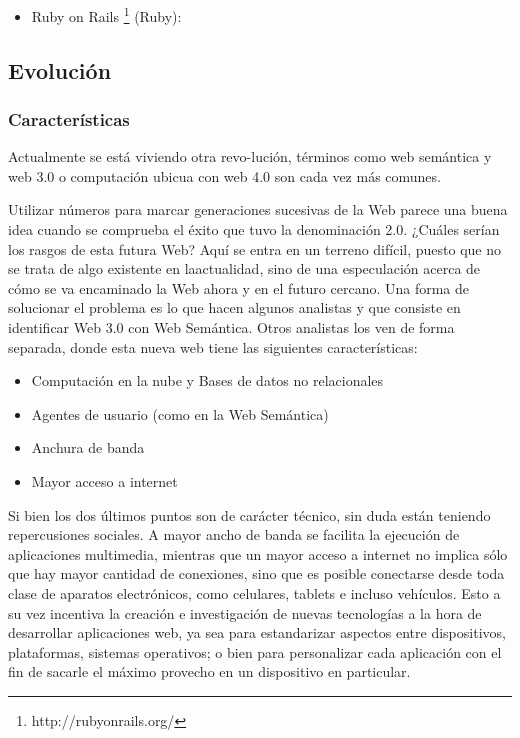 \begin{itemize}
 \item Ruby on Rails \footnote{http://rubyonrails.org/} (Ruby): 
\end{itemize}

 
\subsection{Evolución}

\subsubsection{Características}
Actualmente se está viviendo otra revo-lución, términos como web semántica y web 3.0 o computación 
ubicua con web 4.0 son cada vez más comunes.

Utilizar números para marcar generaciones sucesivas de la Web parece una buena idea cuando se 
comprueba el éxito que tuvo la denominación 2.0. ¿Cuáles serían los rasgos de esta futura Web? Aquí 
se entra en un terreno difícil, puesto que no se trata de algo existente en laactualidad, sino de una 
especulación acerca de cómo se va encaminado la Web ahora y en el futuro cercano. Una forma de solucionar el 
problema es lo que hacen algunos analistas y que consiste en identificar Web 3.0 con Web Semántica. Otros 
analistas los ven de forma separada, donde esta nueva web tiene las siguientes características:

\begin{itemize}
 \item Computación en la nube y Bases de datos no relacionales
 \item Agentes de usuario (como en la Web Semántica)
 \item Anchura de banda
 \item Mayor acceso a internet
\end{itemize}

Si bien los dos últimos puntos son de carácter técnico, sin duda están teniendo repercusiones sociales. 
A mayor ancho de banda se facilita la ejecución de aplicaciones multimedia, mientras que un mayor acceso 
a internet no implica sólo que hay mayor cantidad de conexiones, sino que es posible conectarse desde toda 
clase de aparatos electrónicos, como celulares, tablets e incluso vehículos. Esto a su vez incentiva la 
creación e investigación de nuevas tecnologías a la hora de desarrollar aplicaciones web, ya sea para estandarizar
aspectos entre dispositivos, plataformas, sistemas operativos; o bien para personalizar cada aplicación con el 
fin de sacarle el máximo provecho en un dispositivo en particular.\\

